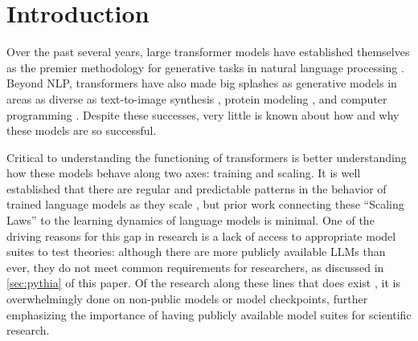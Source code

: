 \documentclass{article}
\theoremstyle{plain}
\theoremstyle{definition}
\theoremstyle{remark}
\begin{document}
\section{Introduction}\label{sec:introduction}
Over the past several years, large transformer models have established themselves as the premier methodology for generative tasks in natural language processing \citep{brown2020language,sanh2021multitask,chowdhery2022palm}. Beyond NLP, transformers have also made big splashes as generative models in areas as diverse as text-to-image synthesis \citep{ramesh2022hierarchical,crowson2022vqgan,rombach2022high}, protein modeling \citep{jumper2021highly,ahdritz2022openfold}, and computer programming \citep{chen2021evaluating,xu2022systematic,fried2022incoder}. Despite these successes, very little is known about how and why these models are so successful.

Critical to understanding the functioning of transformers is better understanding how these models behave along two axes: training and scaling. It is well established that there are regular and predictable patterns in the behavior of trained language models as they scale \citep{kaplan2020scaling,henighan2020scaling,hernandez2021scaling,mikami2021scaling,pu2021scaling,sharma2020neural,ghorbani2021scaling}, but prior work connecting these ``Scaling Laws'' to the learning dynamics of language models is minimal. One of the driving reasons for this gap in research is a lack of access to appropriate model suites to test theories: although there are more publicly available LLMs than ever, they do not meet common requirements for researchers, as discussed in \cref{sec:pythia} of this paper.  Of the research along
these lines that does exist \citep{mcgrath2021acquisition,tirumala2022memorization,xia2022training},  it is overwhelmingly done on non-public models or model checkpoints, further emphasizing the importance of having publicly available model suites
for scientific research.
\end{document}
